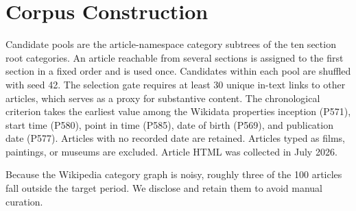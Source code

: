 
\section{\datasetWikipediaName{} Corpus Construction}
\label{app:wiki-corpus}

Candidate pools are the article-namespace category subtrees of the ten
section root categories. An article reachable from several sections is
assigned to the first section in a fixed order and is used once.
Candidates within each pool are shuffled with seed 42. The selection
gate requires at least 30 unique in-text links to other articles, which
serves as a proxy for substantive content. The chronological criterion
takes the earliest value among the Wikidata properties inception (P571),
start time (P580), point in time (P585), date of birth (P569), and
publication date (P577). Articles with no recorded date are retained.
Articles typed as films, paintings, or museums are excluded. Article
HTML was collected in July 2026.

Because the Wikipedia category graph is noisy, roughly three of the 100
articles fall outside the target period. We disclose and retain them to
avoid manual curation.
